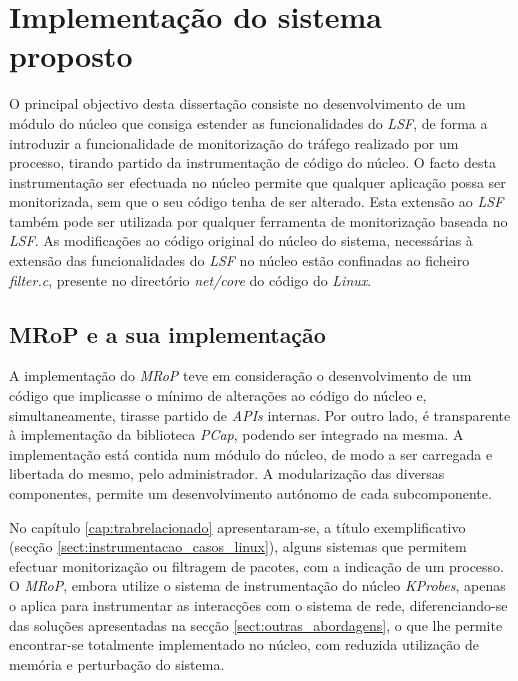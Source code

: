 \chapter{Implementação do sistema proposto}
\label{cap:Implementacao}




O principal objectivo desta dissertação consiste no desenvolvimento de um módulo do núcleo que consiga estender as funcionalidades do \textit{LSF}, de forma a introduzir a funcionalidade de monitorização do tráfego realizado por um processo, tirando partido da instrumentação de código do núcleo.
O facto desta instrumentação ser efectuada no núcleo permite que qualquer aplicação possa ser monitorizada, sem que o seu código tenha de ser alterado.
Esta extensão ao \textit{LSF} também pode ser utilizada por qualquer ferramenta de monitorização baseada no \textit{LSF}.
As modificações ao código original do núcleo do sistema, necessárias à extensão das funcionalidades do \textit{LSF} no núcleo estão confinadas ao ficheiro \textit{filter.c}, presente no directório \textit{net/core} do código do \textit{Linux}.

\section{MRoP e a sua implementação}
\label{sec:mrop_implementation}

A implementação do \textit{MRoP} teve em consideração o desenvolvimento de um código que implicasse o mínimo de alterações ao código do núcleo e, simultaneamente, tirasse partido de \textit{APIs} internas.
Por outro lado, é transparente à implementação da biblioteca \textit{PCap}, podendo ser integrado na mesma.
A implementação está contida num módulo do núcleo, de modo a ser carregada e libertada do mesmo, pelo administrador.
A modularização das diversas componentes, permite um desenvolvimento autónomo de cada subcomponente.

No capítulo \ref{cap:trabrelacionado} apresentaram-se, a título exemplificativo (secção \ref{sect:instrumentacao_casos_linux}), alguns sistemas que permitem efectuar monitorização ou filtragem de pacotes, com a indicação de um processo.
O \textit{MRoP}, embora utilize o sistema de instrumentação do núcleo \textit{KProbes}, apenas o aplica para instrumentar as interacções com o sistema de rede, diferenciando-se das soluções apresentadas na secção \ref{sect:outras_abordagens}, o que lhe permite encontrar-se totalmente implementado no núcleo, com reduzida utilização de memória e perturbação do sistema.

